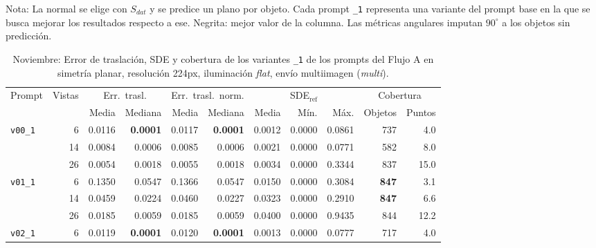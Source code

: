 \begin{table}[htbp]
\vspace{1.5ex}
\begin{minipage}{\wd\tablebox}
\footnotesize
Nota: La normal se elige con $S_{dat}$ y se predice un plano por objeto. Cada prompt \texttt{\_1} representa una variante del prompt base en la que se busca mejorar los resultados respecto a ese. Negrita: mejor valor de la columna. Las métricas angulares imputan $90^\circ$ a los objetos sin predicción.
\end{minipage}
\end{table}

\clearpage

\begin{table}[htbp]
\centering
\caption{Noviembre: Error de traslación, SDE y cobertura de los variantes \texttt{\_1} de los prompts del Flujo A en simetría planar, resolución 224px, iluminación \textit{flat}, envío multiimagen (\textit{multi}).}
\label{tab:nov_plane_variantes_1_posicion}
\begin{lrbox}{\tablebox}
\begin{adjustbox}{max width=\textwidth}
\begin{tabular}{lrrrrrrrrrr}
\toprule
\multirow{2}{*}{Prompt} & \multirow{2}{*}{Vistas} & \multicolumn{2}{c}{Err.\ trasl.} & \multicolumn{2}{c}{Err.\ trasl.\ norm.} & \multicolumn{3}{c}{SDE$_{\mathrm{ref}}$} & \multicolumn{2}{c}{Cobertura} \\
\cmidrule(lr){3-4} \cmidrule(lr){5-6} \cmidrule(lr){7-9} \cmidrule(lr){10-11}
 &  & Media & Mediana & Media & Mediana & Media & Mín. & Máx. & Objetos & Puntos \\
\midrule
\multirow{3}{*}{\texttt{v00\_1}} & 6 & 0.0116 & \textbf{0.0001} & 0.0117 & \textbf{0.0001} & 0.0012 & 0.0000 & 0.0861 & 737 & 4.0 \\
 & 14 & 0.0084 & 0.0006 & 0.0085 & 0.0006 & 0.0021 & 0.0000 & 0.0771 & 582 & 8.0 \\
 & 26 & 0.0054 & 0.0018 & 0.0055 & 0.0018 & 0.0034 & 0.0000 & 0.3344 & 837 & 15.0 \\
\midrule
\multirow{3}{*}{\texttt{v01\_1}} & 6 & 0.1350 & 0.0547 & 0.1366 & 0.0547 & 0.0150 & 0.0000 & 0.3084 & \textbf{847} & 3.1 \\
 & 14 & 0.0459 & 0.0224 & 0.0460 & 0.0227 & 0.0323 & 0.0000 & 0.2910 & \textbf{847} & 6.6 \\
 & 26 & 0.0185 & 0.0059 & 0.0185 & 0.0059 & 0.0400 & 0.0000 & 0.9435 & 844 & 12.2 \\
\midrule
\multirow{3}{*}{\texttt{v02\_1}} & 6 & 0.0119 & \textbf{0.0001} & 0.0120 & \textbf{0.0001} & 0.0013 & 0.0000 & 0.0777 & 717 & 4.0 \\

\end{tabular}
\end{adjustbox}
\end{lrbox}
\end{table}
